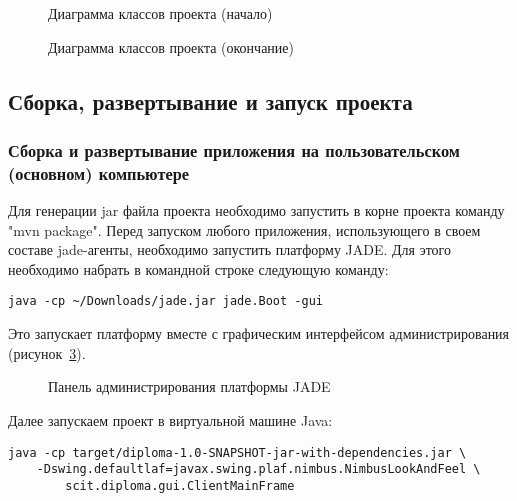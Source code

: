 \begin{figure}[h]
\caption{Диаграмма классов проекта (начало)}
\label{3:class-dia1}
\end{figure}

\begin{figure}[h]
\caption{Диаграмма классов проекта (окончание)}
\label{3:class-dia2}
\end{figure}

\subsection{Сборка, развертывание и запуск проекта}
\subsubsection{Сборка и развертывание приложения на пользовательском (основном) компьютере}
Для генерации jar файла проекта необходимо запустить в корне проекта команду "mvn package". 
Перед запуском любого приложения, использующего в своем составе jade-агенты, необходимо запустить платформу JADE. Для этого необходимо набрать в командной строке следующую команду:
\begin{lstlisting}
java -cp ~/Downloads/jade.jar jade.Boot -gui
\end{lstlisting}
Это запускает платформу вместе с графическим интерфейсом администрирования (рисунок~\ref{3:jade-admin}).
\begin{figure}[h]
\caption{Панель администрирования платформы JADE}
\label{3:jade-admin}
\end{figure}

Далее запускаем проект в виртуальной машине Java:
\begin{lstlisting}
java -cp target/diploma-1.0-SNAPSHOT-jar-with-dependencies.jar \
    -Dswing.defaultlaf=javax.swing.plaf.nimbus.NimbusLookAndFeel \
        scit.diploma.gui.ClientMainFrame
\end{lstlisting}

